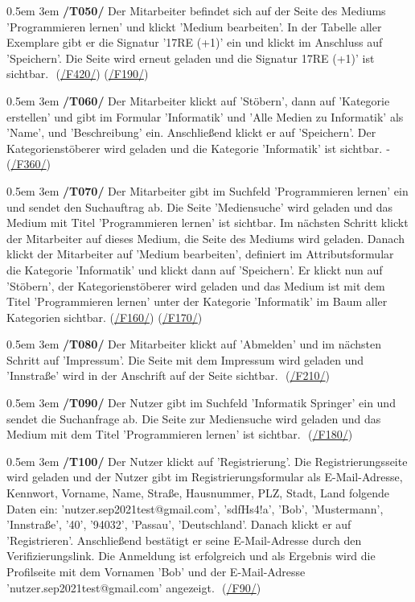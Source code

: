 \documentclass{article}
\newcommand{\specification}[3]{
	{\parindent 0.5em \hangindent 3em \hypertarget{spec:#1:#2}{\textbf{/#1#2/}} #3 \par \nobreak \vspace*{0.5em}}
}
\begin{document}
\specification{T}{050}{Der Mitarbeiter befindet sich auf der Seite des Mediums 'Programmieren lernen' und klickt 'Medium bearbeiten'. In der Tabelle aller Exemplare gibt er die Signatur '17RE (+1)' ein und klickt im Anschluss auf 'Speichern'. Die Seite wird erneut geladen und die Signatur 17RE (+1)' ist sichtbar. ­­­­­ (\hyperlink{spec:F:420}{/F420/}) (\hyperlink{spec:F:190}{/F190/})}
\specification{T}{060}{Der Mitarbeiter klickt auf 'Stöbern', dann auf 'Kategorie erstellen' und gibt im Formular 'Informatik' und 'Alle Medien zu Informatik' als 'Name', und 'Beschreibung' ein. Anschließend klickt er auf 'Speichern'. Der Kategorienstöberer wird geladen und die Kategorie 'Informatik' ist sichtbar. ­­­­­ (\hyperlink{spec:F:360}{/F360/})}
\specification{T}{070}{Der Mitarbeiter gibt im Suchfeld 'Programmieren lernen' ein und sendet den Suchauftrag ab. Die Seite 'Mediensuche' wird geladen und das Medium mit Titel 'Programmieren lernen' ist sichtbar. Im nächsten Schritt klickt der Mitarbeiter auf dieses Medium, die Seite des Mediums wird geladen. Danach klickt der Mitarbeiter auf 'Medium bearbeiten', definiert im Attributsformular die Kategorie 'Informatik­­­­­' und klickt dann auf 'Speichern'. Er klickt nun auf 'Stöbern', der Kategorienstöberer wird geladen und das Medium ist mit dem Titel 'Programmieren lernen' unter der Kategorie 'Informatik' im Baum aller Kategorien sichtbar.  (\hyperlink{spec:F:160}{/F160/}) (\hyperlink{spec:F:170}{/F170/})}
\specification{T}{080}{Der Mitarbeiter klickt auf 'Abmelden' und im nächsten Schritt auf 'Impressum'. Die Seite mit dem Impressum wird geladen und 'Innstraße' wird in der Anschrift auf der Seite sichtbar. ­­­­­ (\hyperlink{spec:F:210}{/F210/})}
\specification{T}{090}{Der Nutzer gibt im Suchfeld 'Informatik Springer' ein und sendet die Suchanfrage ab. Die Seite zur Mediensuche wird geladen und das Medium mit dem Titel 'Programmieren lernen' ist sichtbar. ­­­­­ (\hyperlink{spec:F:180}{/F180/})}
\specification{T}{100}{Der Nutzer klickt auf 'Registrierung'. Die Registrierungsseite wird geladen und der Nutzer gibt im Registrierungsformular als E-Mail-Adresse, Kennwort, Vorname, Name, Straße, Hausnummer, PLZ, Stadt, Land folgende Daten ein: 'nutzer.sep2021test@gmail.com', 'sdfHs4!a', 'Bob', 'Mustermann', 'Innstraße', '40', '94032', 'Passau', 'Deutschland'. Danach klickt er auf 'Registrieren'. Anschließend bestätigt er seine E-Mail-Adresse durch den Verifizierungslink. Die Anmeldung ist erfolgreich und als Ergebnis wird die Profilseite mit dem Vornamen 'Bob' und der E-Mail-Adresse 'nutzer.sep2021test@gmail.com' angezeigt.  ­­­­­ (\hyperlink{spec:F:90}{/F90/})}
\end{document}
